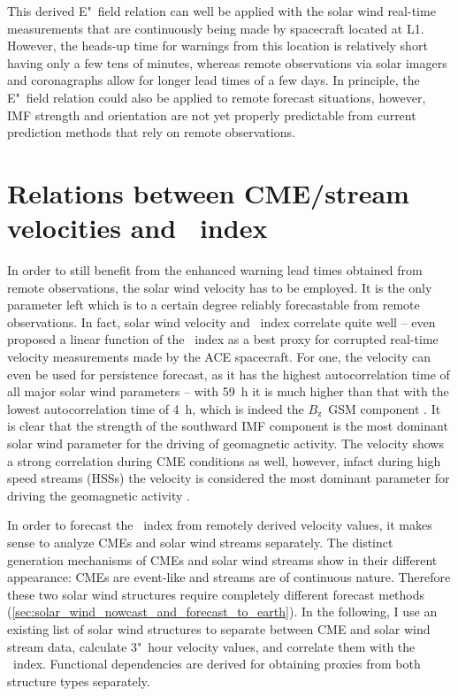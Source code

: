 This derived E"~field relation can well be applied with the solar wind real-time measurements that are continuously being made by spacecraft located at L1. However, the heads-up time for warnings from this location is relatively short having only a few tens of minutes, whereas remote observations via solar imagers and coronagraphs allow for longer lead times of a few days. In principle, the E"~field relation could also be applied to remote forecast situations, however, IMF strength and orientation are not yet properly predictable from current prediction methods that rely on remote observations.


\section{Relations between CME/stream velocities and \Kp~index}
\label{sec:relations_between_cme_stream_v_and_kp}
In order to still benefit from the enhanced warning lead times obtained from remote observations, the solar wind velocity has to be employed. It is the only parameter left which is to a certain degree reliably forecastable from remote observations. In fact, solar wind velocity and \Kp~index correlate quite well -- \citet{Machol2013} even proposed a linear function of the \Kp~index as a best proxy for corrupted real-time velocity measurements made by the ACE spacecraft. For one, the velocity can even be used for persistence forecast, as it has the highest autocorrelation time of all major solar wind parameters -- with \SI{59}{\hour} it is much higher than that with the lowest autocorrelation time of \SI{4}{\hour}, which is indeed the $B_\text{z}$~GSM component \citep{Elliott2013}.
It is clear that the strength of the southward IMF component is the most dominant solar wind parameter for the driving of geomagnetic activity. The velocity shows a strong correlation during CME conditions as well, however, infact during high speed streams (HSSs) the velocity is considered the most dominant parameter for driving the geomagnetic activity \citep{Holappa2014}.

In order to forecast the \Kp~index from remotely derived velocity values, it makes sense to analyze CMEs and solar wind streams separately. The distinct generation mechanisms of CMEs and solar wind streams show in their different appearance: CMEs are event-like and streams are of continuous nature. Therefore these two solar wind structures require completely different forecast methods (\autoref{sec:solar_wind_nowcast_and_forecast_to_earth}).
In the following, I use an existing list of solar wind structures to separate between CME and solar wind stream data, calculate 3"~hour velocity values, and correlate them with the \Kp~index. Functional dependencies are derived for obtaining \Kp{} proxies from both structure types separately.

